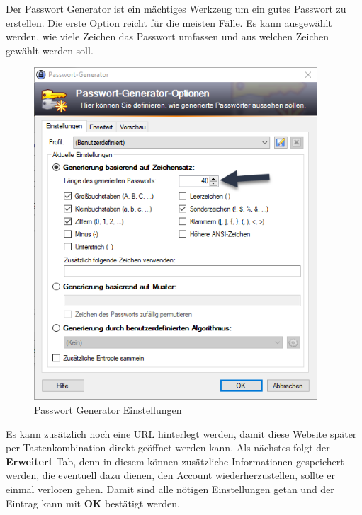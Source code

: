 \documentclass[12pt,a4paper]{scrreprt}
\begin{document}
\newpage

\noindent Der Passwort Generator ist ein mächtiges Werkzeug um ein gutes Passwort zu erstellen. Die erste Option reicht für die meisten Fälle. Es kann ausgewählt werden, wie viele Zeichen das Passwort umfassen und aus welchen Zeichen gewählt werden soll.

\begin{figure}[h]
\begin{center}
\includegraphics[width=300pt]{media/knewentry3.png}
\caption{Passwort Generator Einstellungen}
\label{knewentry3}
\end{center}
\end{figure}

\newpage



\newpage

\noindent Es kann zusätzlich noch eine URL hinterlegt werden, damit diese Website später per Tastenkombination direkt geöffnet werden kann. Als nächstes folgt der \textbf{Erweitert} Tab, denn in diesem können zusätzliche Informationen gespeichert werden, die eventuell dazu dienen, den Account wiederherzustellen, sollte er einmal verloren gehen. Damit sind alle nötigen Einstellungen getan und der Eintrag kann mit \textbf{OK} bestätigt werden.
\end{document}
